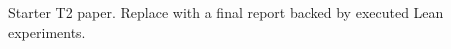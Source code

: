 \documentclass{article}
\begin{document}
Starter T2 paper. Replace with a final report backed by executed Lean experiments.
\end{document}
